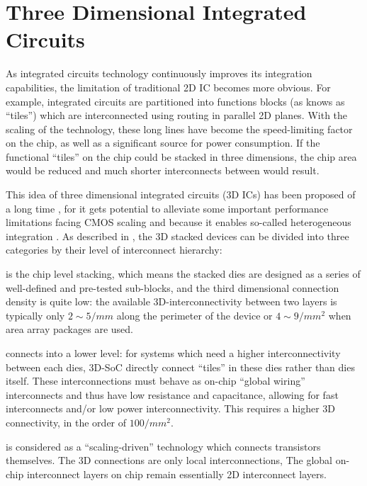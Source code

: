 \section{Three Dimensional Integrated Circuits} \label{sec::3DIC}
As integrated circuits technology continuously improves its integration capabilities,
the limitation of traditional 2D IC becomes more obvious.
For example, integrated circuits are partitioned into functions blocks (as knows as ``tiles'')
which are interconnected using routing in parallel 2D planes.
With the scaling of the technology, these long lines
have become the speed-limiting factor on the chip, as well as a significant
source for power consumption. If the functional ``tiles'' on the
chip could be stacked in three dimensions, the chip area would be
reduced and much shorter interconnects between would result.

This idea of three dimensional integrated circuits (3D ICs) has been proposed of a long time \cite{Beyne20043D},
for it gets potential to alleviate some important performance limitations facing CMOS scaling 
and because it enables so-called heterogeneous integration \cite{Beyne2006Rise}.
As described in \cite{Beyne20043D}, the 3D stacked devices can be divided into three categories
by their level of interconnect hierarchy:
\begin{description}[labelsep=0.5em]
    \item[3D-system-in-a-package (3D-SIP)] is the chip level stacking, which means the stacked
    dies are designed as a series of well-defined and pre-tested sub-blocks, 
    and the third dimensional connection density is quite low: the available 3D-interconnectivity 
    between two layers is typically only $2\sim5/mm$ along the perimeter of the device or $4\sim9/mm^2$
    when area array packages are used.
    
    \item[3D-system-on-a-chip (3D-SoC)] connects into a lower level: for systems which need a higher
    interconnectivity between each dies, 3D-SoC directly connect ``tiles'' in these dies rather than dies
    itself. These interconnections must behave as on-chip ``global wiring'' interconnects and thus have low
    resistance and capacitance, allowing for fast interconnects and/or low power interconnectivity.
    This requires a higher 3D connectivity, in the order of $100/mm^2$.
    
    \item[3D-integrated circuit (3D-IC)] is considered as a ``scaling-driven'' technology 
    which connects transistors themselves. The 3D connections are only local interconnections,
    The global on-chip interconnect layers on chip remain essentially 2D interconnect layers.
\end{description}

